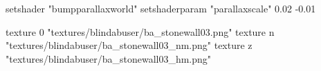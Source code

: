 	setshader "bumpparallaxworld"
	setshaderparam "parallaxscale" 0.02 -0.01

		texture 0 "textures/blindabuser/ba_stonewall03.png"
		texture n "textures/blindabuser/ba_stonewall03_nm.png"
		texture z "textures/blindabuser/ba_stonewall03_hm.png"
